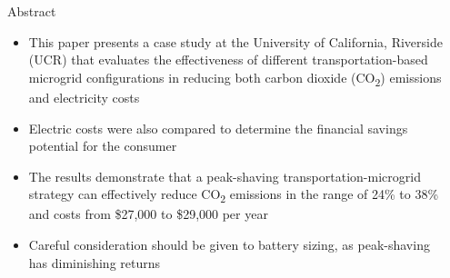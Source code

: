 \documentclass[final, 36 pt]{beamer}
\newlength{\sepwid}
\newlength{\onecolwid}
\begin{document}
\begin{frame}[t] %

\begin{columns}[t] %

\begin{column}{\sepwid}\end{column} %

\begin{column}{\onecolwid} %

\begin{alertblock}{Abstract}
	\begin{itemize}
		\item This paper presents a case study at the University of California, Riverside (UCR) that evaluates the effectiveness of different transportation-based microgrid configurations in reducing both carbon dioxide (CO\textsubscript{2}) emissions and electricity costs
		\item Electric costs were also compared to determine the financial savings potential for the consumer
		\item The results demonstrate that a peak-shaving transportation-microgrid strategy can effectively reduce CO\textsubscript{2} emissions in the range of 24\% to 38\% and costs from \$27,000 to \$29,000 per year
		\item  Careful consideration should be given to battery sizing, as peak-shaving has diminishing returns
	\end{itemize}

\end{alertblock}
\end{column}
\end{columns}
\end{frame}
\end{document}
